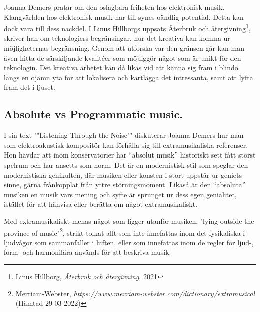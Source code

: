 \documentclass{article}
\begin{document}
Joanna Demers pratar om den oslagbara friheten hos elektronisk musik. Klangvärlden hos elektronisk musik har
till synes oändlig potential. Detta kan dock vara till dess nackdel. I Linus Hillborgs uppsats
Återbruk och återgivning\footnote{Linus Hillborg, \emph{Återbruk och återgivning}, 2021}, skriver han om teknologiers begränsingar, hur det kreativa
kan komma ur möjligheternas begränsning. Genom att utforska var den gränsen går kan man även hitta de
särskiljande kvalitéer som möjliggör något som är unikt för den teknologin. Det kreativa arbetet kan då likas
vid att känna sig fram i blindo längs en ojämn yta för att lokalisera och kartlägga det intressanta, samt att
lyfta fram det i ljuset. 





\subsection{Absolute vs Programmatic music.}


I sin text ""Listening Through the Noise"" diskuterar Joanna Demers hur man som elektroakustisk kompositör kan
förhålla sig till extramusikaliska referenser. Hon hävdar att inom konservatorier har ``absolut musik''
historiskt sett fått störst spelrum och har ansetts som norm. Det är en modernistisk stil som speglar den
modernistiska genikulten, där musiken eller konsten i stort uppstår ur geniets sinne, gärna frånkopplat från
yttre störningsmoment. Likaså är den ``absoluta'' musiken en musik vars mening och syfte är sprunget ur dess
egen genialitet, istället för att hänvisa eller berätta om något extramusikaliskt.

Med extramusikaliskt menas något som ligger utanför musiken, "lying outside the province of
music"\footnote{Merriam-Webster, \emph{https://www.merriam-webster.com/dictionary/extramusical} (Hämtad
29-03-2022)}, strikt tolkat allt som inte innefattas inom det fysikaliska i ljudvågor som sammanfaller i
luften, eller som innefattas inom de regler för ljud-, form- och harmonilära används för att beskriva musik. 
\end{document}
